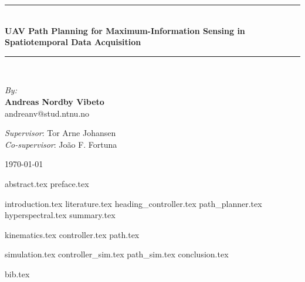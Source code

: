 \documentclass{article}
\newcommand{\HRule}{\rule{\linewidth}{0.5mm}}
\numberwithin{equation}{section}
\begin{document}
\begin{center}
\HRule \\[0.4cm]
{ \huge \bfseries UAV Path Planning for Maximum-Information Sensing in Spatiotemporal Data Acquisition}
\HRule \\[1.5cm]

\begin{center} \large
\emph{By:}\\
\textbf{Andreas Nordby Vibeto}\\
andreanv@stud.ntnu.no
\end{center}

\begin{center}
\emph{Supervisor}: Tor Arne Johansen \\
\emph{Co-supervisor}: João F. Fortuna
\end{center}

\vfill

\begin{figure}[!h]
    \centering
\end{figure}

\vfill

{\large \monthyear\today}

\end{center}
\newpage

{abstract.tex}
\newpage
{preface.tex}
\newpage

\tableofcontents

\newpage

\pagestyle{fancy}
{introduction.tex}
\newpage
{literature.tex}
{heading_controller.tex}
{path_planner.tex}
{hyperspectral.tex}
{summary.tex}

\newpage
{kinematics.tex}
\newpage
{controller.tex}
\newpage
{path.tex}
\newpage

{simulation.tex}
\newpage
{controller_sim.tex}
\newpage
{path_sim.tex}
\newpage
{conclusion.tex}

\newpage
{bib.tex}
\end{document}
